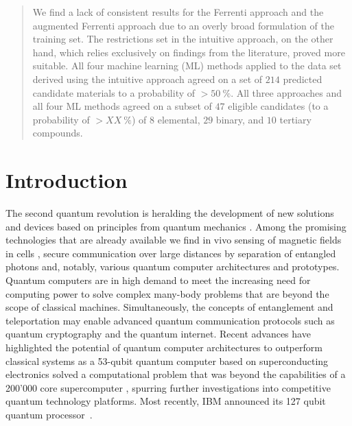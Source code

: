 \documentclass[superscriptaddress,unsortedaddress,
 amsmath,amssymb,
 aps,
]{revtex4-2}
\begin{document}
\begin{abstract}
We find a lack of consistent results for the Ferrenti approach and the augmented Ferrenti approach due to an overly broad formulation of the training set. The restrictions set in the intuitive approach, on the other hand, which relies exclusively on findings from the literature, proved more suitable.  
All four machine learning (ML) methods applied to the data set derived using the intuitive approach agreed on a set of $214$ predicted candidate materials to a probability of $>50 \ \%$. 
All three approaches and all four ML methods agreed on a subset of $47$ eligible candidates (to a probability of $>XX \ \%$) of $8$ elemental, $29$ binary, and $10$ tertiary compounds.

\end{abstract}



\maketitle

\section*{Introduction}
The second quantum revolution is heralding the development of new solutions and devices based on principles from quantum mechanics \cite{Acin2018}. Among the promising technologies that are already available we find in vivo sensing of magnetic fields in cells \cite{Lesage_2013}, secure communication over large distances by separation of entangled photons \cite{Ursin2007} and, notably, various quantum computer architectures and prototypes. 
Quantum computers are in high demand to meet the increasing need for computing power to solve complex many-body problems that are beyond the scope of classical machines.   
Simultaneously, the concepts of entanglement and teleportation may enable advanced quantum communication protocols such as quantum cryptography and the quantum internet.  
Recent advances have highlighted the potential of quantum computer architectures to outperform classical systems as a 53-qubit quantum computer based on superconducting electronics solved a computational problem that was beyond the capabilities of a 200'000 core supercomputer \cite{Arute_2019}, spurring further investigations into competitive quantum technology platforms. Most recently, IBM announced its 127 qubit quantum processor~\cite{IBM2021}.
\end{document}
